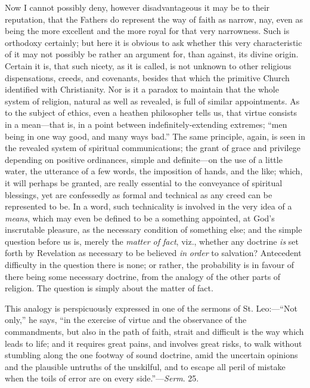 Now I cannot possibly deny, however disadvantageous it may be to
their reputation, that the Fathers do represent the way of faith as
narrow, nay, even as being the more excellent and the more royal for
that very narrowness. Such is orthodoxy certainly; but here it is
obvious to ask whether this very characteristic of it may not possibly
be rather an argument for, than against, its divine origin. Certain it
is, that such nicety, as it is called, is not unknown to other
religious dispensations, creeds, and covenants, besides that which the
primitive Church identified with Christianity. Nor is it a paradox to
maintain that the whole system of religion, natural as well as
revealed, is full of similar appointments. As to the subject of
ethics, even a heathen philosopher tells us, that virtue consists in a
mean—that is, in a point between indefinitely-extending extremes;
``men being in one way good, and many ways bad.'' The same
principle, again, is seen in the revealed system of spiritual
communications; the grant of grace and privilege depending on positive
ordinances, simple and definite—on the use of a little water, the
utterance of a few words, the imposition of hands, and the like;
which, it will perhaps be granted, are really essential to the
conveyance of spiritual blessings, yet are confessedly as formal and
technical as any creed can be represented to be. In a word, such
technicality is involved in the very idea of a \emph{means}, which may
even be defined to be a something appointed, at God's inscrutable
pleasure, as the necessary condition of something else; and the simple
question before us is, merely the \emph{matter of fact}, viz., whether
any doctrine \emph{is} set forth by Revelation as necessary to be
believed \emph{in} \emph{order} to salvation? Antecedent difficulty in
the question there is none; or rather, the probability is in favour of
there being some necessary doctrine, from the analogy of the other
parts of religion. The question is simply about the matter of fact.

This analogy is perspicuously expressed in one of the sermons of
St. Leo:—``Not only,'' he says, ``in the exercise of
virtue and the observance of the commandments, but also in the path of
faith, strait and difficult is the way which leads to life; and it
requires great pains, and involves great risks, to walk without
stumbling along the one footway of sound doctrine, amid the uncertain
opinions and the plausible untruths of the unskilful, and to escape
all peril of mistake when the toils of error are on every side.''—\emph{Serm}.
25.

